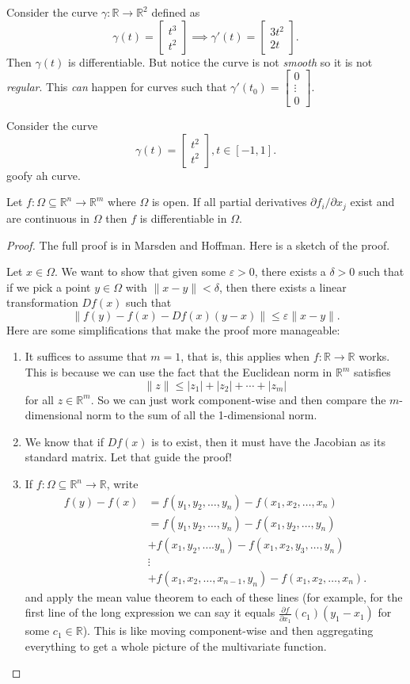 \documentclass[11pt]{article}
\theoremstyle{definition}
\newcommand{\R}{\mathbb{R}}                      %
\newcommand{\mat}{\begin{bmatrix}}
\newcommand{\trix}{\end{bmatrix}}
\newcommand{\dell}{\partial}
\begin{document}
\ex Consider the curve $\gamma:\R\to \R^2$ defined as
$$
\gamma(t)=\mat t^3\\t^2\trix\implies \gamma'(t)=\mat 3t^2\\2t\trix.
$$
Then $\gamma(t)$ is differentiable. But notice the curve is not \textit{smooth} so it is not \textit{regular}. This \textit{can} happen for curves such that $\gamma'(t_0)=\begin{bmatrix}
    0\\\vdots\\0
\end{bmatrix}.$

\ex Consider the curve
$$
\gamma(t)=\mat t^2\\t^2\trix, t\in[-1,1].
$$
goofy ah curve.

\prop Let $f:\Omega\subseteq\R^n\to\R^m$ where $\Omega$ is open. If all partial derivatives $\partial f_i/\partial x_j$ exist and are continuous in $\Omega$ then $f$ is differentiable in $\Omega$. 
\begin{proof}
    The full proof is in Marsden and Hoffman. Here is a sketch of the proof.

    Let $x\in\Omega$. We want to show that given some $\varepsilon>0$, there exists a $\delta>0$ such that if we pick a point $y\in\Omega$ with $\|x-y\|<\delta$, then there exists a linear transformation $Df(x)$ such that
    $$
    \|f(y)-f(x)-Df(x)(y-x)\|\leq \varepsilon\|x-y\|.
    $$
    Here are some simplifications that make the proof more manageable:
    \begin{enumerate}
        \item It suffices to assume that $m=1$, that is, this applies when $f:\R\to\R$ works. This is because we can use the fact that the Euclidean norm in $\R^m$ satisfies
        $$
        \|z\|\leq |z_1|+|z_2|+\cdots+|z_m|
        $$
        for all $z\in \R^m$. So we can just work component-wise and then compare the $m$-dimensional norm to the sum of all the 1-dimensional norm.

        \item We know that if $Df(x)$ is to exist, then it must have the Jacobian as its standard matrix. Let that guide the proof!

        \item If $f:\Omega\subseteq\R^n\to\R$, write 
        \begin{align*}
            f(y)-f(x)&=f(y_1,y_2,\dots,y_n)-f(x_1,x_2,\dots,x_n)\\
            &=f(y_1,y_2,\dots,y_n)-f(x_1,y_2,\dots,y_n)\\
            &+f(x_1,y_2,\dots.y_n)-f(x_1,x_2,y_3,\dots,y_n)\\
            &\vdots\\
            &+f(x_1,x_2,\dots,x_{n-1},y_n)-f(x_1,x_2,\dots,x_n).
        \end{align*}
        and apply the mean value theorem to each of these lines (for example, for the first line of the long expression we can say it equals $\frac{\dell f}{\dell x_1} (c_1)(y_1-x_1)$ for some $c_1\in \R$). This is like moving component-wise and then aggregating everything to get a whole picture of the multivariate function.
    \end{enumerate}
\end{proof}
\end{document}
